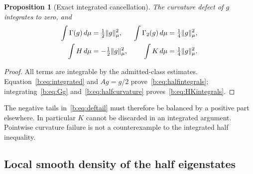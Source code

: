 \documentclass[11pt,a4paper]{article}
\numberwithin{equation}{section}
\newtheorem{proposition}[theorem]{Proposition}
\theoremstyle{definition}\newtheorem{definition}[theorem]{Definition}
\theoremstyle{remark}\newtheorem{remark}[theorem]{Remark}
\begin{document}
\begin{proposition}[Exact integrated cancellation]\label{b:prop:cancellation}
The curvature defect of $g$ integrates to zero, and
\begin{align}
 \int\Gamma(g)\,d\mu&=\tfrac12\lVert g\rVert_\mu^2,
 &\int\Gamma_2(g)\,d\mu&=\tfrac14\lVert g\rVert_\mu^2,\label{b:eq:halfintegrals}\\
 \int H\,d\mu&=-\tfrac12\lVert g\rVert_\mu^2,
 &\int K\,d\mu&=\tfrac14\lVert g\rVert_\mu^2.\label{b:eq:HKintegrals}
\end{align}
\end{proposition}
\begin{proof}
All terms are integrable by the admitted-class estimates. Equation~\eqref{b:eq:integrated} and $Ag=g/2$ prove~\eqref{b:eq:halfintegrals}; integrating~\eqref{b:eq:Gg} and~\eqref{b:eq:halfcurvature} proves~\eqref{b:eq:HKintegrals}.
\end{proof}

The negative tails in~\eqref{b:eq:deftail} must therefore be balanced by a positive part elsewhere. In particular $K$ cannot be discarded in an integrated argument. Pointwise curvature failure is not a counterexample to the integrated half inequality.

\subsection{Local smooth density of the half eigenstates}\label{b:sec:density}
\end{document}
